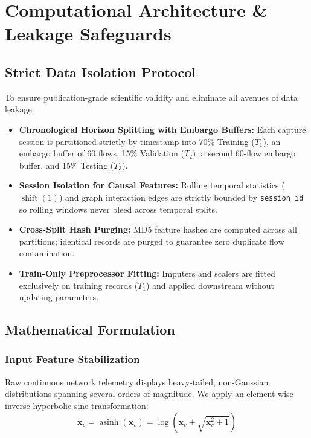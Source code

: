 \documentclass[11pt,a4paper]{article}
\begin{document}
\section{Computational Architecture \& Leakage Safeguards}
\label{sec:architecture}

\subsection{Strict Data Isolation Protocol}
To ensure publication-grade scientific validity and eliminate all avenues of data leakage:
\begin{itemize}[itemsep=3pt]
    \item \textbf{Chronological Horizon Splitting with Embargo Buffers:} Each capture session is partitioned strictly by timestamp into 70\% Training ($T_1$), an embargo buffer of 60 flows, 15\% Validation ($T_2$), a second 60-flow embargo buffer, and 15\% Testing ($T_3$).
    \item \textbf{Session Isolation for Causal Features:} Rolling temporal statistics ($\operatorname{shift}(1)$) and graph interaction edges are strictly bounded by \texttt{session\_id} so rolling windows never bleed across temporal splits.
    \item \textbf{Cross-Split Hash Purging:} MD5 feature hashes are computed across all partitions; identical records are purged to guarantee zero duplicate flow contamination.
    \item \textbf{Train-Only Preprocessor Fitting:} Imputers and scalers are fitted exclusively on training records ($T_1$) and applied downstream without updating parameters.
\end{itemize}

\subsection{Mathematical Formulation}

\subsubsection{Input Feature Stabilization}
Raw continuous network telemetry displays heavy-tailed, non-Gaussian distributions spanning several orders of magnitude. We apply an element-wise inverse hyperbolic sine transformation:
\begin{equation}
\tilde{\mathbf{x}}_v = \operatorname{asinh}(\mathbf{x}_v) = \log\left(\mathbf{x}_v + \sqrt{\mathbf{x}_v^2 + 1}\right)
\end{equation}
\end{document}
